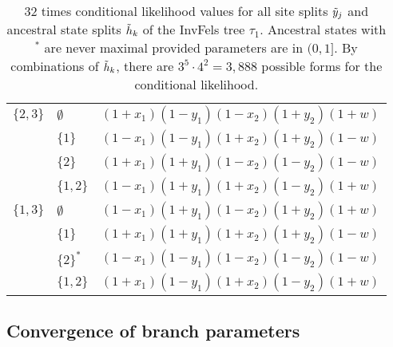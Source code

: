 \begin{table}
\begin{tabular}{|l|ll|}
$\{2,3\}$  &$\emptyset$&$(1+x_1)(1-y_1)(1-x_2)(1+y_2)(1+w)$\\
&$\{1\}$&$(1-x_1)(1-y_1)(1+x_2)(1+y_2)(1-w)$               \\
&$\{2\}$&$(1+x_1)(1+y_1)(1-x_2)(1-y_2)(1-w)$               \\
&$\{1,2\}$&$(1-x_1)(1+y_1)(1+x_2)(1-y_2)(1+w)$             \\

$\{1,3\}$  &$\emptyset$&$(1-x_1)(1+y_1)(1-x_2)(1+y_2)(1+w)$\\
&$\{1\}$&$(1+x_1)(1+y_1)(1+x_2)(1+y_2)(1-w)$               \\
&$\{2\}^*$&$(1-x_1)(1-y_1)(1-x_2)(1-y_2)(1-w)$             \\
&$\{1,2\}$&$(1+x_1)(1-y_1)(1+x_2)(1-y_2)(1+w)$             \\
\hline
\end{tabular}
\caption{
32 times conditional likelihood values for all site splits $\tilde{y}_j$ and ancestral state splits $\tilde{h}_k$ of the InvFels tree $\tau_1$.
Ancestral states with $^*$ are never maximal provided parameters are in $(0,1]$.
By combinations of $\tilde{h}_k$, there are $3^5\cdot 4^2=3,888$ possible forms for the conditional likelihood.
}
\label{tab:farris_likelihoods}
\end{table}


\subsection*{Convergence of branch parameters}

